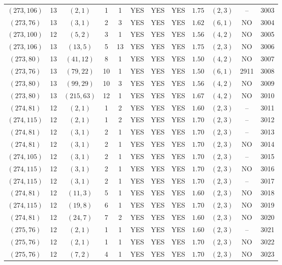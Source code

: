 \begin{longtable}{|c|c|c|c|c|c|c|c|c|c|c|c|}
$(273,106)$ & 13 & $(2,1)$ & 1 & 1 & YES & YES & YES & $1.75$ & $(2,3)$ & -- & 3003\\
$(273,76)$ & 13 & $(3,1)$ & 2 & 3 & YES & YES & YES & $1.62$ & $(6,1)$ & NO & 3004\\
$(273,100)$ & 12 & $(5,2)$ & 3 & 1 & YES & YES & YES & $1.56$ & $(4,2)$ & NO & 3005\\
$(273,106)$ & 13 & $(13,5)$ & 5 & 13 & YES & YES & YES & $1.75$ & $(2,3)$ & NO & 3006\\
$(273,80)$ & 13 & $(41,12)$ & 8 & 1 & YES & YES & YES & $1.50$ & $(4,2)$ & NO & 3007\\
$(273,76)$ & 13 & $(79,22)$ & 10 & 1 & YES & YES & YES & $1.50$ & $(6,1)$ & 2911 & 3008\\
$(273,80)$ & 13 & $(99,29)$ & 10 & 3 & YES & YES & YES & $1.56$ & $(4,2)$ & NO & 3009\\
$(273,80)$ & 13 & $(215,63)$ & 12 & 1 & YES & YES & YES & $1.67$ & $(4,2)$ & NO & 3010\\
$(274,81)$ & 12 & $(2,1)$ & 1 & 2 & YES & YES & YES & $1.60$ & $(2,3)$ & -- & 3011\\
$(274,115)$ & 12 & $(2,1)$ & 1 & 2 & YES & YES & YES & $1.70$ & $(2,3)$ & -- & 3012\\
$(274,81)$ & 12 & $(3,1)$ & 2 & 1 & YES & YES & YES & $1.70$ & $(2,3)$ & -- & 3013\\
$(274,81)$ & 12 & $(3,1)$ & 2 & 1 & YES & YES & YES & $1.70$ & $(2,3)$ & NO & 3014\\
$(274,105)$ & 12 & $(3,1)$ & 2 & 1 & YES & YES & YES & $1.70$ & $(2,3)$ & -- & 3015\\
$(274,115)$ & 12 & $(3,1)$ & 2 & 1 & YES & YES & YES & $1.70$ & $(2,3)$ & NO & 3016\\
$(274,115)$ & 12 & $(3,1)$ & 2 & 1 & YES & YES & YES & $1.70$ & $(2,3)$ & -- & 3017\\
$(274,81)$ & 12 & $(11,3)$ & 5 & 1 & YES & YES & YES & $1.60$ & $(2,3)$ & NO & 3018\\
$(274,115)$ & 12 & $(19,8)$ & 6 & 1 & YES & YES & YES & $1.70$ & $(2,3)$ & NO & 3019\\
$(274,81)$ & 12 & $(24,7)$ & 7 & 2 & YES & YES & YES & $1.60$ & $(2,3)$ & NO & 3020\\
$(275,76)$ & 12 & $(2,1)$ & 1 & 1 & YES & YES & YES & $1.60$ & $(2,3)$ & -- & 3021\\
$(275,76)$ & 12 & $(2,1)$ & 1 & 1 & YES & YES & YES & $1.70$ & $(2,3)$ & NO & 3022\\
$(275,76)$ & 12 & $(7,2)$ & 4 & 1 & YES & YES & YES & $1.70$ & $(2,3)$ & NO & 3023\\

\end{longtable}
